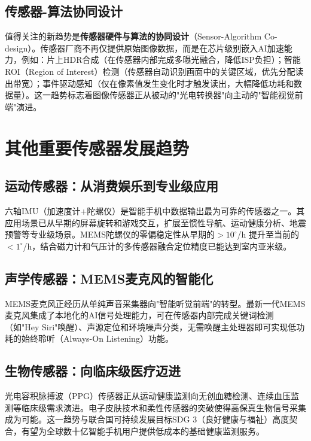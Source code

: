 \documentclass[12pt, a4paper]{ctexart}
\begin{document}
\subsection{传感器-算法协同设计}

值得关注的新趋势是\textbf{传感器硬件与算法的协同设计}（Sensor-Algorithm Co-design）。传感器厂商不再仅提供原始图像数据，而是在芯片级别嵌入AI加速能力，例如：片上HDR合成（在传感器内部完成多曝光融合，降低ISP负担）；智能ROI（Region of Interest）检测（传感器自动识别画面中的关键区域，优先分配读出带宽）；事件驱动感知（仅在像素值发生变化时才触发读出，大幅降低功耗和数据量）。这一趋势标志着图像传感器正从被动的"光电转换器"向主动的"智能视觉前端"演进。


\section{其他重要传感器发展趋势}

\subsection{运动传感器：从消费娱乐到专业级应用}

六轴IMU（加速度计+陀螺仪）是智能手机中数据输出最为可靠的传感器之一\cite{alibaba2026}。其应用场景已从早期的屏幕旋转和游戏交互，扩展至惯性导航、运动健康分析、地震预警等专业级场景。MEMS陀螺仪的零偏稳定性从早期的$>10^{\circ}$/h 提升至当前的 $<1^{\circ}$/h，结合磁力计和气压计的多传感器融合定位精度已能达到室内亚米级\cite{mdpi2024}。

\subsection{声学传感器：MEMS麦克风的智能化}

MEMS麦克风正经历从单纯声音采集器向"智能听觉前端"的转型。最新一代MEMS麦克风集成了本地化的AI信号处理能力，可在传感器内部完成关键词检测（如"Hey Siri"唤醒）、声源定位和环境噪声分类，无需唤醒主处理器即可实现低功耗的始终聆听（Always-On Listening）功能。

\subsection{生物传感器：向临床级医疗迈进}

光电容积脉搏波（PPG）传感器正从运动健康监测向无创血糖检测、连续血压监测等临床级需求演进。电子皮肤技术和柔性传感器的突破使得高保真生物信号采集成为可能\cite{innosensor2025}。这一趋势与联合国可持续发展目标SDG 3（良好健康与福祉）高度契合，有望为全球数十亿智能手机用户提供低成本的基础健康监测服务。
\end{document}
